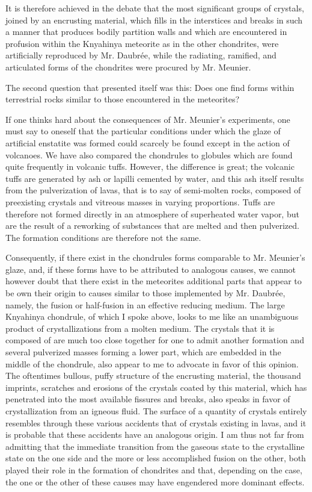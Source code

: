 \documentclass[a4paper, 12pt, oneside]{article}
\begin{document}
It is therefore achieved in the debate that the most significant groups of crystals, joined by an encrusting material, which fills in the interstices and breaks in such a manner that produces bodily partition walls and which are encountered in profusion within the Knyahinya meteorite as in the other chondrites, were artificially reproduced by Mr. Daubrée, while the radiating, ramified, and articulated forms of the chondrites were procured by Mr. Meunier.

The second question that presented itself was this: Does one find forms within terrestrial rocks similar to those encountered in the meteorites?

If one thinks hard about the consequences of Mr. Meunier's experiments, one must say to oneself that the particular conditions under which the glaze of artificial enstatite was formed could scarcely be found except in the action of volcanoes. We have also compared the chondrules to globules which are found quite frequently in volcanic tuffs. However, the difference is great; the volcanic tuffs are generated by ash or lapilli cemented by water, and this ash itself results from the pulverization of lavas, that is to say of semi-molten rocks, composed of preexisting crystals and vitreous masses in varying proportions. Tuffs are therefore not formed directly in an atmosphere of superheated water vapor, but are the result of a reworking of substances that are melted and then pulverized. The formation conditions are therefore not the same.

Consequently, if there exist in the chondrules forms comparable to Mr. Meunier's glaze, and, if these forms have to be attributed to analogous causes, we cannot however doubt that there exist in the meteorites additional parts that appear to be own their origin to causes similar to those implemented by Mr. Daubrée, namely, the fusion or half-fusion in an effective reducing medium. The large Knyahinya chondrule, of which I spoke above, looks to me like an unambiguous product of crystallizations from a molten medium. The crystals that it is composed of are much too close together for one to admit another formation and several pulverized masses forming a lower part, which are embedded in the middle of the chondrule, also appear to me to advocate in favor of this opinion. The oftentimes bullous, puffy structure of the encrusting material, the thousand imprints, scratches and erosions of the crystals coated by this material, which has penetrated into the most available fissures and breaks, also speaks in favor of crystallization from an igneous fluid. The surface of a quantity of crystals entirely resembles through these various accidents that of crystals existing in lavas, and it is probable that these accidents have an analogous origin. I am thus not far from admitting that the immediate transition from the gaseous state to the crystalline state on the one side and the more or less accomplished fusion on the other, both played their role in the formation of chondrites and that, depending on the case, the one or the other of these causes may have engendered more dominant effects.
\end{document}
